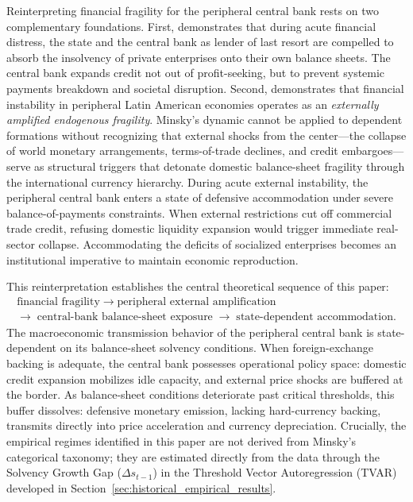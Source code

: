 Reinterpreting financial fragility for the peripheral central bank rests on two complementary foundations. First, \citet[p.~21]{Foley2003} demonstrates that during acute financial distress, the state and the central bank as lender of last resort are compelled to absorb the insolvency of private enterprises onto their own balance sheets. The central bank expands credit not out of profit-seeking, but to prevent systemic payments breakdown and societal disruption. Second, \citet{Chamorro2025} demonstrates that financial instability in peripheral Latin American economies operates as an \emph{externally amplified endogenous fragility}. Minsky's dynamic cannot be applied to dependent formations without recognizing that external shocks from the center---the collapse of world monetary arrangements, terms-of-trade declines, and credit embargoes---serve as structural triggers that detonate domestic balance-sheet fragility through the international currency hierarchy. During acute external instability, the peripheral central bank enters a state of defensive accommodation under severe balance-of-payments constraints. When external restrictions cut off commercial trade credit, refusing domestic liquidity expansion would trigger immediate real-sector collapse. Accommodating the deficits of socialized enterprises becomes an institutional imperative to maintain economic reproduction.

This reinterpretation establishes the central theoretical sequence of this paper:
\[
\begin{gathered}
\text{financial fragility} \;\longrightarrow\; \text{peripheral external amplification} \\
\longrightarrow\; \text{central-bank balance-sheet exposure} \;\longrightarrow\; \text{state-dependent accommodation}.
\end{gathered}
\]
The macroeconomic transmission behavior of the peripheral central bank is state-dependent on its balance-sheet solvency conditions. When foreign-exchange backing is adequate, the central bank possesses operational policy space: domestic credit expansion mobilizes idle capacity, and external price shocks are buffered at the border. As balance-sheet conditions deteriorate past critical thresholds, this buffer dissolves: defensive monetary emission, lacking hard-currency backing, transmits directly into price acceleration and currency depreciation. Crucially, the empirical regimes identified in this paper are not derived from Minsky's categorical taxonomy; they are estimated directly from the data through the Solvency Growth Gap ($\Delta s_{t-1}$) in the Threshold Vector Autoregression (TVAR) developed in Section~\ref{sec:historical_empirical_results}.
